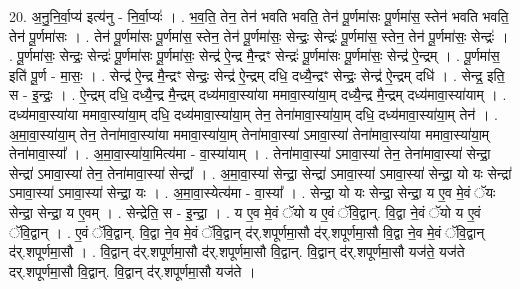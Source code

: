 \documentclass[17pt]{extarticle}
\begin{document}
20. अ॒नु॒नि॒र्वा॒प्य॑ इत्य॑नु - नि॒र्वा॒प्यः॑ । . भ॒व॒ति॒ तेन॒ तेन॑ भवति भवति॒ तेन॑ पू॒र्णमा॑सः पू॒र्णमा॑स॒ स्तेन॑ भवति भवति॒ तेन॑ पू॒र्णमा॑सः । . तेन॑ पू॒र्णमा॑सः पू॒र्णमा॑स॒ स्तेन॒ तेन॑ पू॒र्णमा॑सः॒ सेन्द्रः॒ सेन्द्रः॑ पू॒र्णमा॑स॒ स्तेन॒ तेन॑ पू॒र्णमा॑सः॒ सेन्द्रः॑ । . पू॒र्णमा॑सः॒ सेन्द्रः॒ सेन्द्रः॑ पू॒र्णमा॑सः पू॒र्णमा॑सः॒ सेन्द्र॑ ऐ॒न्द्र मै॒न्द्रꣳ सेन्द्रः॑ पू॒र्णमा॑सः पू॒र्णमा॑सः॒ सेन्द्र॑ ऐ॒न्द्रम् । . पू॒र्णमा॑स॒ इति॑ पू॒र्ण - मा॒सः॒ । . सेन्द्र॑ ऐ॒न्द्र मै॒न्द्रꣳ सेन्द्रः॒ सेन्द्र॑ ऐ॒न्द्रम् दधि॒ दध्यै॒न्द्रꣳ सेन्द्रः॒ सेन्द्र॑ ऐ॒न्द्रम् दधि॑ । . सेन्द्र॒ इति॒ स - इ॒न्द्रः॒ । . ऐ॒न्द्रम् दधि॒ दध्यै॒न्द्र मै॒न्द्रम् दध्य॑मावा॒स्या॑या ममावा॒स्या॑या॒म् दध्यै॒न्द्र मै॒न्द्रम् दध्य॑मावा॒स्या॑याम् । . दध्य॑मावा॒स्या॑या ममावा॒स्या॑या॒म् दधि॒ दध्य॑मावा॒स्या॑या॒म् तेन॒ तेना॑मावा॒स्या॑या॒म् दधि॒ दध्य॑मावा॒स्या॑या॒म् तेन॑ । . अ॒मा॒वा॒स्या॑या॒म् तेन॒ तेना॑मावा॒स्या॑या ममावा॒स्या॑या॒म् तेना॑मावा॒स्या॑ ऽमावा॒स्या॑ तेना॑मावा॒स्या॑या ममावा॒स्या॑या॒म् तेना॑मावा॒स्या᳚ । . अ॒मा॒वा॒स्या॑या॒मित्य॑मा - वा॒स्या॑याम् । . तेना॑मावा॒स्या॑ ऽमावा॒स्या॑ तेन॒ तेना॑मावा॒स्या॑ सेन्द्रा॒ सेन्द्रा॑ ऽमावा॒स्या॑ तेन॒ तेना॑मावा॒स्या॑ सेन्द्रा᳚ । . अ॒मा॒वा॒स्या॑ सेन्द्रा॒ सेन्द्रा॑ ऽमावा॒स्या॑ ऽमावा॒स्या॑ सेन्द्रा॒ यो यः सेन्द्रा॑ ऽमावा॒स्या॑ ऽमावा॒स्या॑ सेन्द्रा॒ यः । . अ॒मा॒वा॒स्येत्य॑मा - वा॒स्या᳚ । . सेन्द्रा॒ यो यः सेन्द्रा॒ सेन्द्रा॒ य ए॒व मे॒वं ॅयः सेन्द्रा॒ सेन्द्रा॒ य ए॒वम् । . सेन्द्रेति॒ स - इ॒न्द्रा॒ । . य ए॒व मे॒वं ॅयो य ए॒वं ॅवि॒द्वान्. वि॒द्वा ने॒वं ॅयो य ए॒वं ॅवि॒द्वान् । . ए॒वं ॅवि॒द्वान्. वि॒द्वा ने॒व मे॒वं ॅवि॒द्वान् द॑र्.शपूर्णमा॒सौ द॑र्.शपूर्णमा॒सौ वि॒द्वा ने॒व मे॒वं ॅवि॒द्वान् द॑र्.शपूर्णमा॒सौ । . वि॒द्वान् द॑र्.शपूर्णमा॒सौ द॑र्.शपूर्णमा॒सौ वि॒द्वान्. वि॒द्वान् द॑र्.शपूर्णमा॒सौ यज॑ते॒ यज॑ते दर्.शपूर्णमा॒सौ वि॒द्वान्. वि॒द्वान् द॑र्.शपूर्णमा॒सौ यज॑ते । \newline
\end{document}
